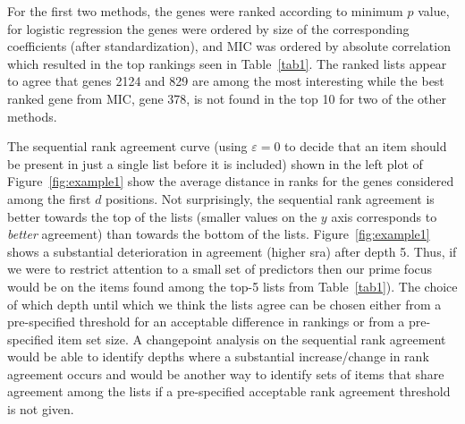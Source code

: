 \documentclass[oupdraft]{bio}
\makeatletter
\newcommand{\ie}{\emph{i.e.}\@\xspace}
\newcommand{\added}[1]{{\color{added}{}#1}}
\makeatother
\begin{document}
\added{
For the first two methods, the genes were ranked according to minimum
$p$ value, for logistic regression the genes were ordered by size of
the corresponding coefficients (after standardization), and MIC was
ordered by absolute correlation which resulted in the top rankings
seen in Table~\ref{tab1}. The ranked lists appear to agree that genes
2124 and 829 are among the most interesting while the best ranked
gene from MIC, gene 378, is not found in the top 10 for two of the
other methods.







The sequential rank agreement curve (using $\varepsilon=0$ to decide
that an item should be present in just a single list before it is
included) shown in the left plot of Figure~\ref{fig:example1} show the
average distance in ranks for the genes considered among the first $d$
positions. Not surprisingly, the sequential rank agreement is better
towards the top of the lists (smaller values on the $y$ axis
corresponds to \emph{better} agreement) than towards the bottom of the
lists. Figure~\ref{fig:example1} shows a substantial deterioration in agreement (higher sra) after
depth 5. Thus, if we were to restrict attention to a small set of
predictors then our prime focus would be on the items found among the
top-5 lists from Table~\ref{tab1}). The choice of which depth until
which we think the lists agree can be chosen either from a
pre-specified threshold for an acceptable difference in rankings or
from a pre-specified item set size. A changepoint analysis on the
sequential rank agreement would be able to identify depths where a
substantial increase/change in rank agreement occurs and would be
another way to identify sets of items that share agreement among the
lists if a pre-specified acceptable rank agreement threshold is not
given.}
\end{document}
